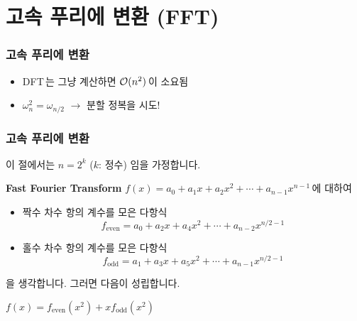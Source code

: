 \section{고속 푸리에 변환 (FFT)}

\begin{frame}
    \frametitle{고속 푸리에 변환}
    \begin{itemize}
        \setlength{\itemsep}{1em}
        \item DFT\,는 그냥 계산하면 \(\mathcal{O}(n^2)\)\,이 소요됨 \pause
        \item \(\omega_n^2 = \omega_{n/2}\) \(\rightarrow\) 분할 정복을 시도!
    \end{itemize}
\end{frame}

\begin{frame}
    \frametitle{고속 푸리에 변환}
    이 절에서는 \(n = 2^k\) (\(k\): 정수) 임을 가정합니다.

    \pause

    \begin{block}{\textbf{Fast Fourier Transform}}
        \(f(x) = a_0 + a_1 x + a_2 x^2 + \cdots + a_{n-1} x^{n - 1}\)\,에 대하여
        \begin{itemize}
            \item \alert{짝수} 차수 항의 계수를 모은 다항식
                  \vspace*{-10px}
                  \[
                      f_{\mathrm{even}} = a_0 + a_2 x + a_4 x^2 + \cdots + a_{n-2} x^{n/2 - 1}
                  \]
                  \vspace*{-30px}
            \item \alert{홀수} 차수 항의 계수를 모은 다항식
                  \vspace*{-10px}
                  \[
                      f_{\mathrm{odd}} = a_1 + a_3 x + a_5 x^2 + \cdots + a_{n-1} x^{n/2 - 1}
                  \]
                  \vspace*{-20px}
        \end{itemize}
        을 생각합니다. \pause 그러면 다음이 성립합니다.
        \vspace*{-5px}
        \begin{center}
            \alert{\(f(x) = f_{\mathrm{even}}(x^2) + x f_{\mathrm{odd}}(x^2)\)}
        \end{center}
        \vspace*{3px}
    \end{block}
\end{frame}

